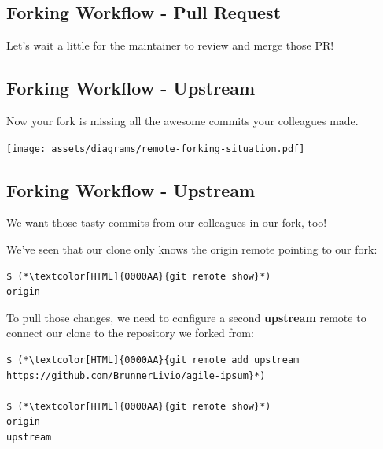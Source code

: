 \subsection{Forking Workflow - Pull Request}
\begin{frame}[fragile]
  \subslidetitle

  \vspace{8em}
  \begin{center}
  Let's wait a little for the maintainer to review and merge those PR!
  \end{center}

\end{frame}

\subsection{Forking Workflow - Upstream}
\begin{frame}[fragile]
  \subslidetitle

  Now your fork is missing all the awesome commits your colleagues made.

  \vspace{2em}
  \centerline{\texttt{[image: assets/diagrams/remote-forking-situation.pdf]}}

\end{frame}

\subsection{Forking Workflow - Upstream}
\begin{frame}[fragile]
  \subslidetitle

  We want those tasty commits from our colleagues in our fork, too!

  We've seen that our clone only knows the origin remote pointing to our fork:

  \begin{lstlisting}
$ (*\textcolor[HTML]{0000AA}{git remote show}*)
origin
\end{lstlisting}

  To pull those changes, we need to configure a second \textbf{upstream} remote
  to connect our clone to the repository we forked from:

  \begin{lstlisting}
$ (*\textcolor[HTML]{0000AA}{git remote add upstream https://github.com/BrunnerLivio/agile-ipsum}*)

$ (*\textcolor[HTML]{0000AA}{git remote show}*)
origin
upstream
\end{lstlisting}

\end{frame}

